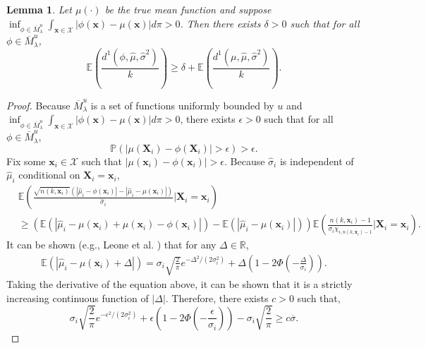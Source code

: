 \documentclass[12pt]{article}
\newcommand{\spa}[1]{\text{{$\mathcal{#1}$}}}
\newcommand{\des}{\ensuremath{\bm{x}}}
\newcommand{\vect}[1]{\ensuremath{\bm{#1}}}
\newcommand{\desCap}{\ensuremath{\bm{X}}}
\newtheorem{lemma}{Lemma}
\begin{document}
\begin{lemma}
\label{lemma: deltaGapExp}
    Let $\mu(\cdot)$ be the true mean function and suppose $\inf_{\phi \in \overline{M}_\lambda^u} \int_{\vect{x} \in \spa{X}}|\phi(\vect{x})-\mu(\vect{x})|d\pi>0$. Then there exists $\delta>0$ such that for all $\phi \in \overline{M}_\lambda^u$,
    $$\mathbb{E}\left (  \frac{d^1(\phi,\hat{\mu},\hat{\sigma}^2)}{k}\right )\geq \delta+\mathbb{E}\left (  \frac{d^1(\mu,\hat{\mu},\hat{\sigma}^2)}{k}\right ).$$
\end{lemma}
\begin{proof}
    Because $\overline{M}_\lambda^u$ is a set of functions uniformly bounded by $u$ and $\inf_{\phi \in \overline{M}_\lambda^u} \int_{\vect{x} \in \spa{X}}|\phi(\vect{x})-\mu(\vect{x})|d\pi>0$, there exists $\epsilon>0$ such that for all $\phi \in \overline{M}_\lambda^u$,
    $$\mathbb{P}\left ( |\mu(\desCap_i)-\phi(\desCap_i)|>\epsilon \right )>\epsilon.$$
    Fix some $\des_i \in \spa{X}$ such that $|\mu(\des_i)-\phi(\des_i)|>\epsilon$. Because $\hat{\sigma}_i$ is independent of $\hat{\mu}_i$ conditional on $\desCap_i=\des_i$,
    \begin{equation*}
        \begin{split}
           &\mathbb{E}\left ( \frac{\sqrt{n(k,\des_i)}(|\hat{\mu}_i-\phi(\des_i)|-|\hat{\mu}_i-\mu(\des_i)|)}{\hat{\sigma}_i}\Big\vert\desCap_i=\des_i \right )\\
           &\geq   \left (\mathbb{E}\left (|\hat{\mu}_i-\mu(\des_i)+\mu(\des_i)-\phi(\des_i)|\right )-\mathbb{E}\left (|\hat{\mu}_i-\mu(\des_i)|\right ) \right )\mathbb{E}\left (\frac{n(k,\des_i)-1}{\sigma_i\chi_{i,n(k,\des_i)-1}}\Big\vert\desCap_i=\des_i\right ).
        \end{split}
    \end{equation*}
    It can be shown (e.g., Leone et al. \cite{leone1961folded}) that for any $\Delta \in \mathbb{R}$,
    \begin{equation*}
        \begin{split}
             \mathbb{E}\left (|\hat{\mu}_i-\mu(\des_i)+\Delta|\right )=\sigma_i\sqrt{\frac{2}{\pi}}e^{-\Delta^2/(2\sigma_i^2)}+\Delta(1-2\Phi(-\frac{\Delta}{\sigma_i})).
        \end{split}
    \end{equation*}
    Taking the derivative of the equation above, it can be shown that it is a strictly increasing continuous function of $|\Delta|$. Therefore, there exists $c>0$ such that,
    $$\sigma_i\sqrt{\frac{2}{\pi}}e^{-\epsilon^2/(2\sigma_i^2)}+\epsilon(1-2\Phi(-\frac{\epsilon}{\sigma_i}))-\sigma_i\sqrt{\frac{2}{\pi}}\geq c\overline{\sigma}.$$

\end{proof}
\end{document}
